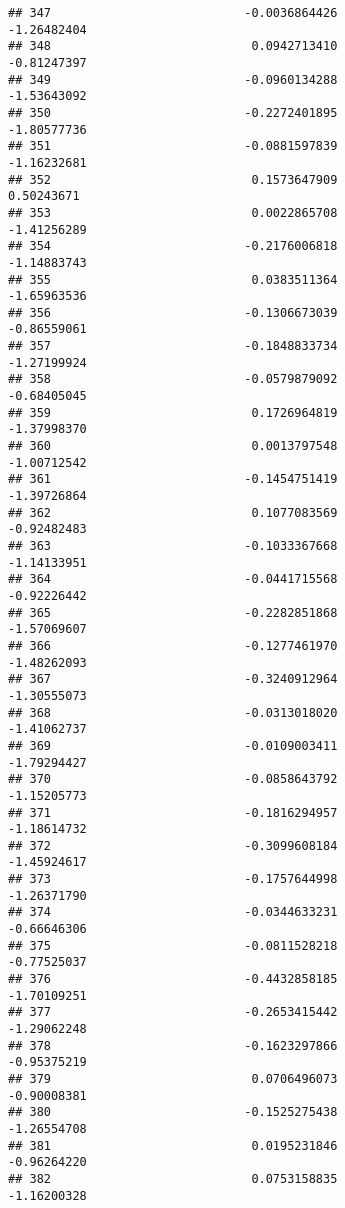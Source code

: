 \documentclass[
]{article}
\begin{document}
\begin{verbatim}
## 347                           -0.0036864426                -1.26482404
## 348                            0.0942713410                -0.81247397
## 349                           -0.0960134288                -1.53643092
## 350                           -0.2272401895                -1.80577736
## 351                           -0.0881597839                -1.16232681
## 352                            0.1573647909                 0.50243671
## 353                            0.0022865708                -1.41256289
## 354                           -0.2176006818                -1.14883743
## 355                            0.0383511364                -1.65963536
## 356                           -0.1306673039                -0.86559061
## 357                           -0.1848833734                -1.27199924
## 358                           -0.0579879092                -0.68405045
## 359                            0.1726964819                -1.37998370
## 360                            0.0013797548                -1.00712542
## 361                           -0.1454751419                -1.39726864
## 362                            0.1077083569                -0.92482483
## 363                           -0.1033367668                -1.14133951
## 364                           -0.0441715568                -0.92226442
## 365                           -0.2282851868                -1.57069607
## 366                           -0.1277461970                -1.48262093
## 367                           -0.3240912964                -1.30555073
## 368                           -0.0313018020                -1.41062737
## 369                           -0.0109003411                -1.79294427
## 370                           -0.0858643792                -1.15205773
## 371                           -0.1816294957                -1.18614732
## 372                           -0.3099608184                -1.45924617
## 373                           -0.1757644998                -1.26371790
## 374                           -0.0344633231                -0.66646306
## 375                           -0.0811528218                -0.77525037
## 376                           -0.4432858185                -1.70109251
## 377                           -0.2653415442                -1.29062248
## 378                           -0.1623297866                -0.95375219
## 379                            0.0706496073                -0.90008381
## 380                           -0.1525275438                -1.26554708
## 381                            0.0195231846                -0.96264220
## 382                            0.0753158835                -1.16200328

\end{verbatim}
\end{document}
